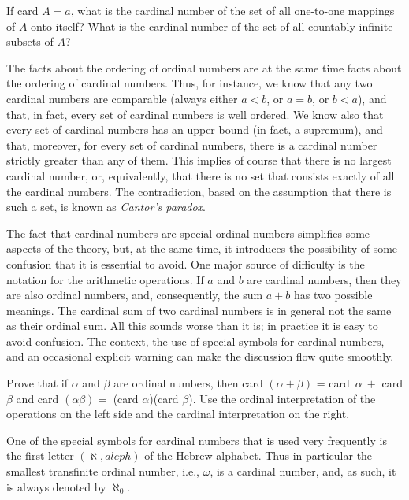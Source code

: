 \begin{exercise} If card $A = a$, what is the cardinal number of the set of all one-to-one mappings of $A$ onto itself? What is the cardinal number of the set of all countably infinite subsets of $A$?
\end{exercise}

The facts about the ordering of ordinal numbers are at the same time facts about the ordering of cardinal numbers. Thus, for instance, we know that any two cardinal numbers are comparable (always either $a < b$, or $a = b$, or $b < a$), and that, in fact, every set of cardinal numbers is well ordered. We know also that every set of cardinal numbers has an upper bound (in fact, a supremum), and that, moreover, for every set of cardinal numbers, there is a cardinal number strictly greater than any of them. This implies of course that there is no largest cardinal number, or, equivalently, that there is no set that consists exactly of all the cardinal numbers. The contradiction, based on the assumption that there is such a set, is known as \textit{Cantor's paradox}. 

The fact that cardinal numbers are special ordinal numbers simplifies some aspects of the theory, but, at the same time, it introduces the possibility of some confusion that it is essential to avoid. One major source of difficulty is the notation for the arithmetic operations. If $a$ and $b$ are cardinal numbers, then they are also ordinal numbers, and, consequently, the sum $a + b$ has two possible meanings. The cardinal sum of two cardinal numbers is in general not the same as their ordinal sum. All this sounds worse than it is; in practice it is easy to avoid confusion. The context, the use of special symbols for cardinal numbers, and an occasional explicit warning can make the discussion flow quite smoothly. 

\begin{exercise} Prove that if $\alpha$ and $\beta$ are ordinal numbers, then card $(\alpha + \beta)$ = card~$\alpha\ +$ card $\beta$ and card $(\alpha \beta) =$ (card $\alpha$)(card $\beta$). Use the ordinal interpretation of the operations on the left side and the cardinal interpretation on the right. 
\end{exercise}

One of the special symbols for cardinal numbers that is used very frequently is the first letter $(\aleph, aleph)$ of the Hebrew alphabet. Thus in particular the smallest transfinite ordinal number, i.e., $\omega$, is a cardinal number, and, as such, it is always denoted by $\aleph_{0}$.

